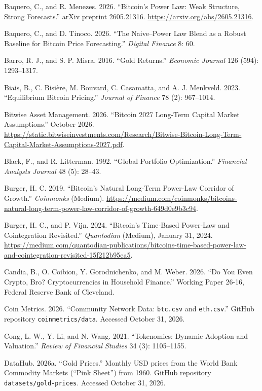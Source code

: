 \documentclass[12pt]{article}
\DeclareRobustCommand{\chg}[1]{{\color{blue}#1}}
\theoremstyle{plain}
\theoremstyle{remark}
\begin{document}
\chg{Baquero, C., and R. Menezes. 2026. ``Bitcoin's Power Law: Weak Structure, Strong Forecasts.'' arXiv preprint 2605.21316. \url{https://arxiv.org/abs/2605.21316}.}

\chg{Baquero, C., and D. Tinoco. 2026. ``The Naive--Power Law Blend as a Robust Baseline for Bitcoin Price Forecasting.'' \emph{Digital Finance} 8: 60.}

\chg{Barro, R. J., and S. P. Misra. 2016. ``Gold Returns.'' \emph{Economic Journal} 126 (594): 1293--1317.}

\chg{Biais, B., C. Bisi\`{e}re, M. Bouvard, C. Casamatta, and A. J. Menkveld. 2023. ``Equilibrium Bitcoin Pricing.'' \emph{Journal of Finance} 78 (2): 967--1014.}

\chg{Bitwise Asset Management. 2026. ``Bitcoin 2027 Long-Term Capital Market Assumptions.'' October 2026. \url{https://static.bitwiseinvestments.com/Research/Bitwise-Bitcoin-Long-Term-Capital-Market-Assumptions-2027.pdf}.}

\chg{Black, F., and R. Litterman. 1992. ``Global Portfolio Optimization.'' \emph{Financial Analysts Journal} 48 (5): 28--43.}

\chg{Burger, H. C. 2019. ``Bitcoin's Natural Long-Term Power-Law Corridor of Growth.'' \emph{Coinmonks} (Medium). \url{https://medium.com/coinmonks/bitcoins-natural-long-term-power-law-corridor-of-growth-649d0e9b3c94}.}

\chg{Burger, H. C., and P. Vijn. 2024. ``Bitcoin's Time-Based Power-Law and Cointegration Revisited.'' \emph{Quantodian} (Medium), January 31, 2024. \url{https://medium.com/quantodian-publications/bitcoins-time-based-power-law-and-cointegration-revisited-15f212b95ea5}.}

\chg{Candia, B., O. Coibion, Y. Gorodnichenko, and M. Weber. 2026. ``Do You Even Crypto, Bro? Cryptocurrencies in Household Finance.'' Working Paper 26-16, Federal Reserve Bank of Cleveland.}

\chg{Coin Metrics. 2026. ``Community Network Data: \texttt{btc.csv} and \texttt{eth.csv}.'' GitHub repository \texttt{coinmetrics/data}. Accessed October 31, 2026.}

Cong, L. W., \chg{Y. Li, and N. Wang}. 2021. ``Tokenomics: Dynamic Adoption and Valuation.'' \emph{Review of Financial Studies} 34 (3): 1105--1155.

\chg{DataHub. 2026a. ``Gold Prices.'' Monthly USD prices from the World Bank Commodity Markets (``Pink Sheet'') from 1960. GitHub repository \texttt{datasets/gold-prices}. Accessed October 31, 2026.}
\end{document}
